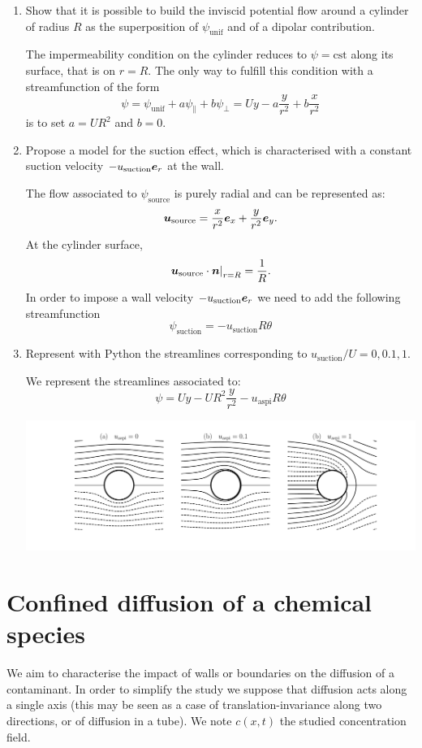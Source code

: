 \documentclass[11pt,a4paper]{article}
\newcommand{\bn}{\matrixsym{n}}
\newcommand{\be}{\matrixsym e}
\newcommand{\bu}{\matrixsym u}
\begin{document}
\begin{enumerate}
\begin{answer}
{      
      \par}
\end{answer}
\item Show that it is possible to build the inviscid potential flow around a cylinder of radius $R$ as the superposition of  $\psi_\text{unif}$ and of a dipolar contribution.
\begin{answer}
The impermeability condition on the cylinder reduces to $\psi = \text{cst}$ along its surface, that is on $r = R$. The only way to fulfill this condition with a streamfunction of the form
$$
\psi = \psi_\text{unif}  + a \psi_{\parallel} + b \psi_{\perp} = Uy - a \frac{y}{r^2} + b \frac{x}{r^2}
 $$
is to set $a = U R^2$ and $b = 0$.
\end{answer}
\item Propose a model for the suction effect, which is characterised with a constant suction velocity  $- u_\text{suction} \be_r$ at the wall.
\begin{answer}
The flow associated to $\psi_\text{source}$ is purely radial and can be represented as:
$$
\bu_\text{source} = \frac{x}{r^2} \be_x + \frac{y}{r^2} \be_y.
$$
At the cylinder surface,
$$
\left.\bu_\text{source}\cdot\bn\right|_{r=R} = \frac{1}{R}.
$$
In order to impose a wall velocity $- u_\text{suction} \be_r$ we need to add the following streamfunction
$$
\psi_\text{suction} = - u_\text{suction} R \theta
$$
\end{answer}
\item Represent with Python the streamlines corresponding to $u_\text{suction} / U = 0, 0.1, 1$.
\begin{answer}
We represent the streamlines associated to:
$$
\psi = Uy - U R^2  \frac{y}{r^2} - u_\text{aspi} R \theta
$$
{\centering
      \includegraphics[width=16cm]{aspi.pdf}
      \par}
\end{answer}
\end{enumerate}
\section{Confined diffusion of a chemical species}
We aim to characterise the impact of walls or boundaries on the diffusion of a contaminant. In order to simplify the study we suppose that diffusion acts along a single axis (this may be seen as a case of translation-invariance along two directions, or of diffusion in a tube). We note $c(x,t)$ the studied concentration field.
\end{document}

